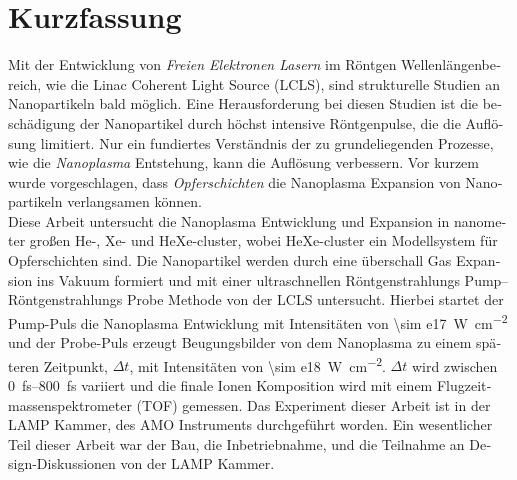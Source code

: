\section*{Kurzfassung}
\begin{otherlanguage}{german}
Mit der Entwicklung von \textit{Freien Elektronen Lasern} im Röntgen Wellenlängenbereich, wie die Linac Coherent Light Source (LCLS), sind strukturelle Studien an Nanopartikeln bald möglich. Eine Herausforderung bei diesen Studien ist die beschädigung der Nanopartikel durch höchst intensive Röntgenpulse, die die Auflösung limitiert. Nur ein fundiertes Verständnis der zu grundeliegenden Prozesse, wie die \textit{Nanoplasma} Entstehung, kann die Auflösung verbessern. Vor kurzem wurde vorgeschlagen, dass \textit{Opferschichten} die Nanoplasma Expansion von Nanopartikeln verlangsamen können.\\[0.4\baselineskip]
%
Diese Arbeit untersucht die Nanoplasma Entwicklung und Expansion in nanometer großen He-, Xe- und HeXe-cluster, wobei HeXe-cluster ein Modellsystem für Opferschichten sind. Die Nanopartikel werden durch eine überschall Gas Expansion ins Vakuum formiert und mit einer ultraschnellen Röntgenstrahlungs Pump--Röntgenstrahlungs Probe Methode von der LCLS untersucht. Hierbei startet der Pump-Puls die Nanoplasma Entwicklung mit Intensitäten von \SI{\sim e17}{\watt\per\square\centi\meter} und der Probe-Puls erzeugt Beugungsbilder von dem Nanoplasma zu einem späteren Zeitpunkt, $\Delta t$, mit Intensitäten von \SI{\sim e18}{\watt\per\square\centi\meter}. $\Delta t$ wird zwischen \SIrange{0}{800}{\femto\second} variiert und die finale Ionen Komposition wird mit einem Flugzeitmassenspektrometer (TOF) gemessen. Das Experiment dieser Arbeit ist in der LAMP Kammer, des AMO Instruments durchgeführt worden. Ein wesentlicher Teil dieser Arbeit war der Bau, die Inbetriebnahme, und die Teilnahme an Design-Diskussionen von der LAMP Kammer.\\[0.4\baselineskip]
%

\end{otherlanguage}
